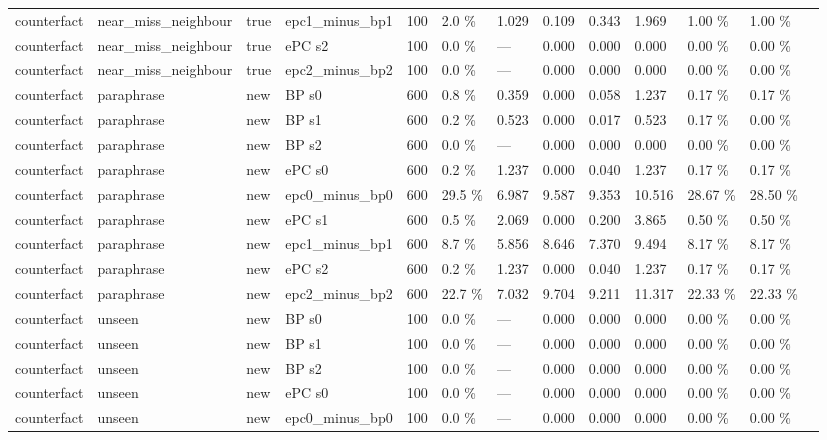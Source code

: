 \documentclass[10pt,a4paper]{article}
\begin{document}
\begin{center}
\begin{tabularx}{\textwidth}{@{}p{}XXXXXXXXXXXX@{}}
counterfact & near\_miss\_neighbour & true & epc1\_minus\_bp1 & 100 & 2.0 \% & 1.029 & 0.109 & 0.343 & 1.969 & 1.00 \% & 1.00 \% &  \\
counterfact & near\_miss\_neighbour & true & ePC s2 & 100 & 0.0 \% & — & 0.000 & 0.000 & 0.000 & 0.00 \% & 0.00 \% &  \\
counterfact & near\_miss\_neighbour & true & epc2\_minus\_bp2 & 100 & 0.0 \% & — & 0.000 & 0.000 & 0.000 & 0.00 \% & 0.00 \% &  \\
counterfact & paraphrase & new & BP s0 & 600 & 0.8 \% & 0.359 & 0.000 & 0.058 & 1.237 & 0.17 \% & 0.17 \% &  \\
counterfact & paraphrase & new & BP s1 & 600 & 0.2 \% & 0.523 & 0.000 & 0.017 & 0.523 & 0.17 \% & 0.00 \% &  \\
counterfact & paraphrase & new & BP s2 & 600 & 0.0 \% & — & 0.000 & 0.000 & 0.000 & 0.00 \% & 0.00 \% &  \\
counterfact & paraphrase & new & ePC s0 & 600 & 0.2 \% & 1.237 & 0.000 & 0.040 & 1.237 & 0.17 \% & 0.17 \% &  \\
counterfact & paraphrase & new & epc0\_minus\_bp0 & 600 & 29.5 \% & 6.987 & 9.587 & 9.353 & 10.516 & 28.67 \% & 28.50 \% &  \\
counterfact & paraphrase & new & ePC s1 & 600 & 0.5 \% & 2.069 & 0.000 & 0.200 & 3.865 & 0.50 \% & 0.50 \% &  \\
counterfact & paraphrase & new & epc1\_minus\_bp1 & 600 & 8.7 \% & 5.856 & 8.646 & 7.370 & 9.494 & 8.17 \% & 8.17 \% &  \\
counterfact & paraphrase & new & ePC s2 & 600 & 0.2 \% & 1.237 & 0.000 & 0.040 & 1.237 & 0.17 \% & 0.17 \% &  \\
counterfact & paraphrase & new & epc2\_minus\_bp2 & 600 & 22.7 \% & 7.032 & 9.704 & 9.211 & 11.317 & 22.33 \% & 22.33 \% &  \\
counterfact & unseen & new & BP s0 & 100 & 0.0 \% & — & 0.000 & 0.000 & 0.000 & 0.00 \% & 0.00 \% &  \\
counterfact & unseen & new & BP s1 & 100 & 0.0 \% & — & 0.000 & 0.000 & 0.000 & 0.00 \% & 0.00 \% &  \\
counterfact & unseen & new & BP s2 & 100 & 0.0 \% & — & 0.000 & 0.000 & 0.000 & 0.00 \% & 0.00 \% &  \\
counterfact & unseen & new & ePC s0 & 100 & 0.0 \% & — & 0.000 & 0.000 & 0.000 & 0.00 \% & 0.00 \% &  \\
counterfact & unseen & new & epc0\_minus\_bp0 & 100 & 0.0 \% & — & 0.000 & 0.000 & 0.000 & 0.00 \% & 0.00 \% &  \\

\end{tabularx}
\end{center}
\end{document}
